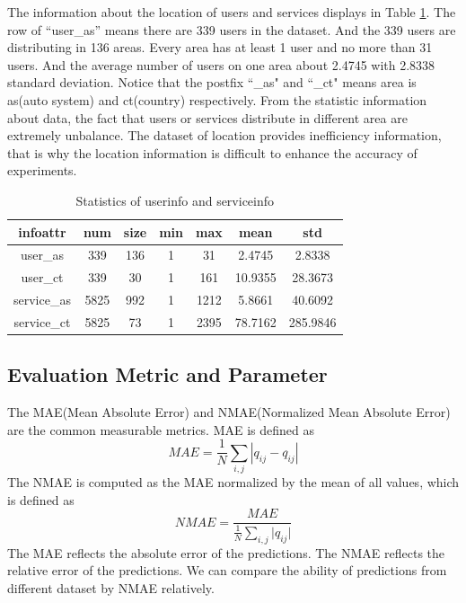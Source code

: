 \documentclass[conference]{IEEEtran}
\begin{document}
\par The information about the location of users and services displays in Table \ref{tb2}. The row of ``user\_as'' means there are 339 users in the dataset. And the 339 users are distributing in 136 areas. Every area has at least 1 user and no more than 31 users. And the average number of users on one area about 2.4745 with 2.8338 standard deviation. Notice that the postfix ``\_as" and ``\_ct" means area is as(auto system) and ct(country) respectively. From the statistic information about data, the fact that users or services distribute in different area are extremely unbalance. The dataset of location provides inefficiency information, that is why the location information is difficult to enhance the accuracy of experiments.

\begin{table}[H]
\begin{threeparttable}
\caption{Statistics of userinfo and serviceinfo}
\label{tb2}
\begin{tabular}{c||c|c||c|c|c|c}
\hline 
infoattr & num & size & min & max & mean & std \\
\hline
user\_as & 339   & 136   & 1     & 31    & 2.4745 & 2.8338 \\
\hline
user\_ct & 339   & 30    & 1     & 161   & 10.9355 & 28.3673 \\
\hline
service\_as & 5825  & 992   & 1     & 1212  & 5.8661 & 40.6092 \\
\hline
service\_ct & 5825  & 73    & 1     & 2395  & 78.7162 & 285.9846 \\
\hline
\end{tabular} 
\end{threeparttable}
\end{table}

\subsection{Evaluation Metric and Parameter}
The MAE(Mean Absolute Error) and NMAE(Normalized Mean Absolute Error) are the common measurable metrics. MAE is defined as 
\begin{equation}
MAE=\frac{1}{N}\sum_{i,j}{|q_{ij}-q^{\hat{}}_{ij}|}
\end{equation}
The NMAE is computed as the MAE normalized by the mean of all values, which is defined as 
\begin{equation}
NMAE=\frac{MAE}{\frac{1}{N}\sum_{i,j}{|q_{ij}}|}
\end{equation}
The MAE reflects the absolute error of the predictions. The NMAE reflects the relative error of the predictions. We can compare the ability of predictions from different dataset by NMAE relatively.
\end{document}
